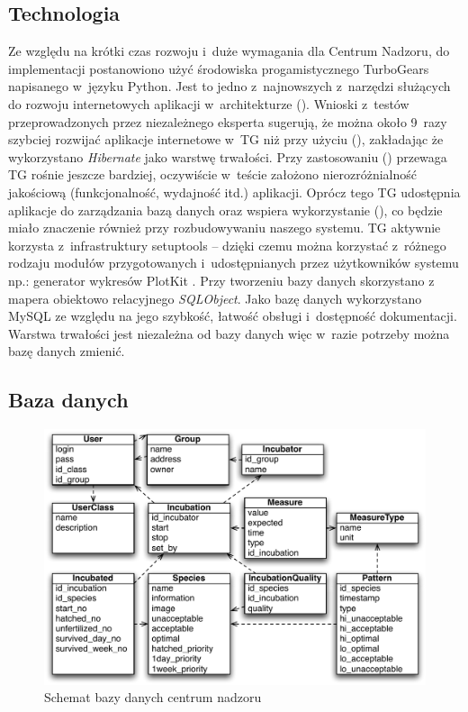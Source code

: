 \subsection{Technologia}
Ze względu na krótki czas rozwoju i~duże wymagania dla Centrum Nadzoru, do
implementacji postanowiono użyć środowiska progamistycznego TurboGears
\cite{TurboGears} napisanego w~języku Python. Jest to jedno z~najnowszych
z~narzędzi służących do rozwoju internetowych aplikacji w~architekturze
 (). Wnioski z~testów
przeprowadzonych przez niezależnego eksperta sugerują, że można około 9~razy
szybciej rozwijać aplikacje internetowe w~TG niż przy użyciu 
(), zakładając że wykorzystano
\emph{Hibernate} jako warstwę trwałości. Przy zastosowaniu 
() przewaga TG rośnie jeszcze bardziej, oczywiście
w~teście założono nierozróżnialność jakościową (funkcjonalność, wydajność itd.)
aplikacji. Oprócz tego TG udostępnia aplikacje do zarządzania bazą danych oraz
wspiera wykorzystanie  (), co będzie miało znaczenie również przy rozbudowywaniu naszego systemu.
TG aktywnie korzysta z~infrastruktury setuptools \cite{setuptools} -- dzięki
czemu można korzystać z~różnego rodzaju modułów przygotowanych i~udostępnianych
przez użytkowników systemu np.: generator wykresów PlotKit \cite{PlotKit}. Przy
tworzeniu bazy danych skorzystano z mapera obiektowo relacyjnego
\emph{SQLObject}. Jako bazę danych wykorzystano MySQL ze względu na jego
szybkość, łatwość obsługi i~dostępność dokumentacji. Warstwa trwałości jest
niezależna od bazy danych więc w~razie potrzeby można bazę danych zmienić. 

\subsection{Baza danych}
\begin{figure}[t]
\centering\includegraphics[width=\textwidth]{figures/SCCDataBase}
\caption{Schemat bazy danych centrum nadzoru}\label{rys:SCCDataBase}
\end{figure}

